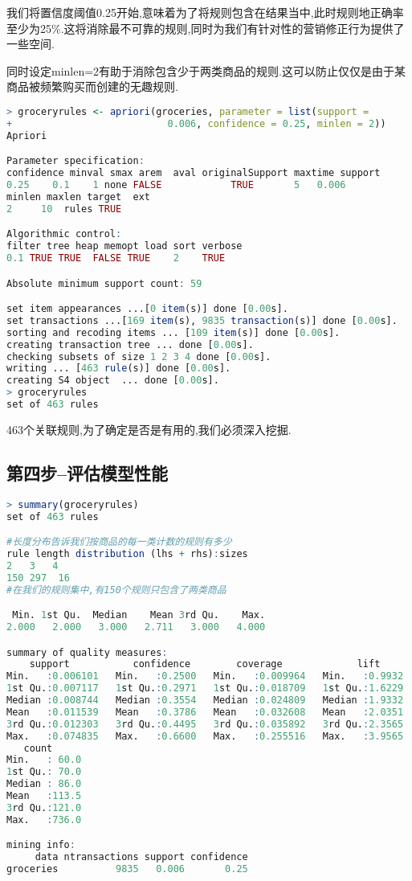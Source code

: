 \documentclass[11pt,a4paper,oneside]{book}
\begin{document}
我们将置信度阈值0.25开始,意味着为了将规则包含在结果当中,此时规则地正确率至少为25\%.这将消除最不可靠的规则,同时为我们有针对性的营销修正行为提供了一些空间.

同时设定minlen=2有助于消除包含少于两类商品的规则.这可以防止仅仅是由于某商品被频繁购买而创建的无趣规则.
\begin{lstlisting}[language=r]
> groceryrules <- apriori(groceries, parameter = list(support =
+                           0.006, confidence = 0.25, minlen = 2))
Apriori

Parameter specification:
confidence minval smax arem  aval originalSupport maxtime support
0.25    0.1    1 none FALSE            TRUE       5   0.006
minlen maxlen target  ext
2     10  rules TRUE

Algorithmic control:
filter tree heap memopt load sort verbose
0.1 TRUE TRUE  FALSE TRUE    2    TRUE

Absolute minimum support count: 59 

set item appearances ...[0 item(s)] done [0.00s].
set transactions ...[169 item(s), 9835 transaction(s)] done [0.00s].
sorting and recoding items ... [109 item(s)] done [0.00s].
creating transaction tree ... done [0.00s].
checking subsets of size 1 2 3 4 done [0.00s].
writing ... [463 rule(s)] done [0.00s].
creating S4 object  ... done [0.00s].
> groceryrules
set of 463 rules 
\end{lstlisting}
463个关联规则,为了确定是否是有用的,我们必须深入挖掘.

\subsection{第四步--评估模型性能}

\begin{lstlisting}[language=r]
> summary(groceryrules)
set of 463 rules

#长度分布告诉我们按商品的每一类计数的规则有多少
rule length distribution (lhs + rhs):sizes
2   3   4 
150 297  16 
#在我们的规则集中,有150个规则只包含了两类商品

 Min. 1st Qu.  Median    Mean 3rd Qu.    Max. 
2.000   2.000   3.000   2.711   3.000   4.000 

summary of quality measures:
    support           confidence        coverage             lift       
Min.   :0.006101   Min.   :0.2500   Min.   :0.009964   Min.   :0.9932  
1st Qu.:0.007117   1st Qu.:0.2971   1st Qu.:0.018709   1st Qu.:1.6229  
Median :0.008744   Median :0.3554   Median :0.024809   Median :1.9332  
Mean   :0.011539   Mean   :0.3786   Mean   :0.032608   Mean   :2.0351  
3rd Qu.:0.012303   3rd Qu.:0.4495   3rd Qu.:0.035892   3rd Qu.:2.3565  
Max.   :0.074835   Max.   :0.6600   Max.   :0.255516   Max.   :3.9565  
   count      
Min.   : 60.0  
1st Qu.: 70.0  
Median : 86.0  
Mean   :113.5  
3rd Qu.:121.0  
Max.   :736.0  

mining info:
     data ntransactions support confidence
groceries          9835   0.006       0.25
\end{lstlisting}
\end{document}
